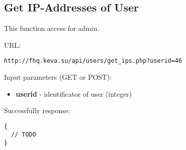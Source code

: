 \subsection{Get IP-Addresses of User}
\par

This function access for admin.

URL:
\begin{Verbatim}[frame=single]
http://fhq.keva.su/api/users/get_ips.php?userid=46
\end{Verbatim}

Input parameters (GET or POST):
\begin{itemize}
  \item \textbf{userid} - identificator of user (integer)
\end{itemize}

Successfully response:  \\
\begin{Verbatim}[frame=single]
{
  // TODO
}
\end{Verbatim}

~
